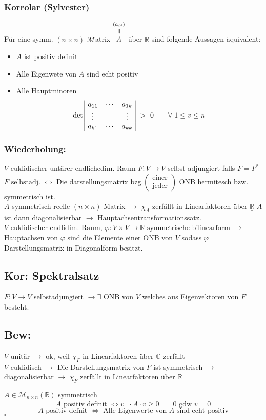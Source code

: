 \documentclass[titlepage,12pt,a4paper,ngerman]{report}
\newenvironment{bew}[1]{\subsection{Bew: #1}}{\hfill$\square$}
\newcommand{\Bew}[2]{\begin{bew}{#1}#2\end{bew}}
\newcommand{\verteq}{\rotatebox{90}{$\,=$}}
\newcommand{\equaltoup}[2]{\overset{\scriptstyle\underset{\mkern4mu\verteq}{#2}}{#1}}
\newcommand{\tx}[1]{\textrm{#1}}
\begin{document}
\subsubsection{Korrolar (Sylvester)}
Für eine symm. $(n \times n)$-$\mathcal M$atrix $\equaltoup{A}{(a_{ij})}$ über $\mathbb R$ sind folgende Aussagen äquivalent:
\begin{itemize}
	\item $A$ ist positiv definit
	\item Alle Eigenwete von $A$ sind echt positiv
	\item Alle Hauptminoren
	$$\det \begin{array}{| ccc |}
	a_{11} & \cdots & a_{1k}\\
	\vdots & & \vdots\\
	a_{k1} & \cdots & a_{kk}	
	\end{array} \ > \ 0 \qquad \forall\  1 \le v \le n$$
\end{itemize}



\subsubsection{Wiederholung:}
$V$ euklidischer untärer endlichedim. Raum $F: V \to V$ selbst adjungiert falls $F = F^*$\\ 
$F \tx{ selbstadj. } \Leftrightarrow$ Die darstellungsmatrix bzg.$\begin{pmatrix}
\tx{einer} \\ \tx{jeder}
\end{pmatrix}$ ONB hermitesch bzw. symmetrisch ist.\\
$A$ symmetrisch reelle $(n \times n)$-Matrix $\rightarrow$ $\chi_A$ zerfällt in Linearfaktoren über $\underline{\underline{\mathbb R}}$
$A$ ist dann diagonalisierbar $\rightarrow$ Hauptachsentransformationssatz.\\ 
$V \tx{ euklidischer endlidim. Raum}$, $\varphi: V \times V \to \mathbb R \tx{ symmetrische bilinearform}$
$\rightarrow$ Hauptachsen von $\varphi$ sind die Elemente einer ONB von $V$ sodass $\varphi$ Darstellungsmatrix in Diagonalform besitzt.
\subsection{Kor: Spektralsatz}
$F:V\to V$ selbstadjungiert $\rightarrow \exists \tx{ ONB von } V$ welches aus Eigenvektoren von $F$ besteht.
\Bew{}{$V$ unitär $\rightarrow$ ok, weil $\chi_F$ in Linearfaktoren über $\mathbb C$ zerfällt\\
	$V$ euklidisch $\rightarrow$ Die Darstellungsmatrix von $F$ ist symmetrisch $\rightarrow$ diagonalisierbar $\rightarrow$ $\chi_F$ zerfällt in Linearfaktoren über $\mathbb R$ 

$ A \in \mathcal{M}_{n \times n} (\mathbb{R}) $ symmetrisch
$$ A \tx{ positiv definit } \Leftrightarrow v^\top \cdot A \cdot v \ge 0 \, \ \ = 0 \tx{ gdw } v = 0$$
$$ A \tx{ positiv defnit } \Leftrightarrow \tx{ Alle Eigenwerte von } A \tx{ sind echt positiv}$$
}
\end{document}
